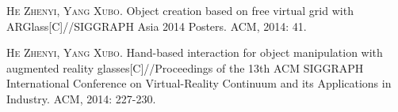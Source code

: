
\begin{publications}{99}

    \item\textsc{He Zhenyi, Yang Xubo}. {Object creation based on free virtual grid with ARGlass}[C]//SIGGRAPH Asia 2014 Posters. ACM, 2014: 41.

    \item\textsc{He Zhenyi, Yang Xubo}. {Hand-based interaction for object manipulation with augmented reality glasses}[C]//Proceedings of the 13th ACM SIGGRAPH International Conference on Virtual-Reality Continuum and its Applications in Industry. ACM, 2014: 227-230.
    
\end{publications}
